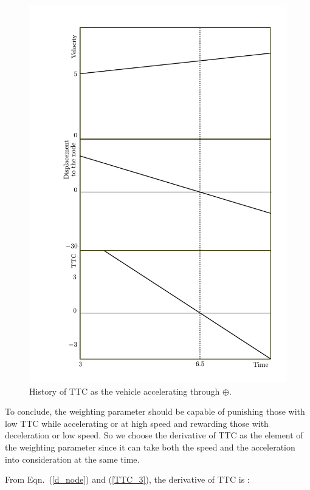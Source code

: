 \documentclass[twocolumn,10pt]{asme2e}
\begin{document}
\begin{figure}[htbp!]
\begin{center}
\includegraphics[scale=0.43]{TTC_change_when_accelerating.pdf}
\end{center}
\caption{History of TTC as the vehicle accelerating through $\oplus$.}
\label{TTC_acc} 
\end{figure}

To conclude, the weighting parameter should be capable of punishing those with low TTC while accelerating or at high speed and rewarding those with deceleration or low speed. So we choose the derivative of TTC as the element of the weighting parameter since it can take both the speed and the acceleration into consideration at the same time.

From Eqn.~(\ref{d_node}) and (\ref{TTC_3}), the derivative of TTC is :
\end{document}
